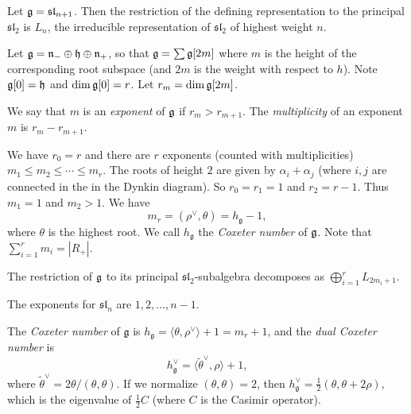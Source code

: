 \begin{example}
  Let $\mathfrak{g} = \mathfrak{sl}_{n + 1}$.
  Then the restriction of the defining
  representation to the principal
  $\mathfrak{sl}_2$ is $L_n$, the
  irreducible representation
  of $\mathfrak{sl}_2$ of highest weight $n$.
\end{example}

\begin{remark}
  Let $\mathfrak{g} = \mathfrak{n}_- \oplus \mathfrak{h} \oplus \mathfrak{n}_+$, so
  that $\mathfrak{g} = \sum \mathfrak{g}[2m]$ where $m$ is the
  height of the corresponding root subspace (and
  $2m$ is the weight with respect to
  $h$).
  Note $\mathfrak{g}[0] = \mathfrak{h}$
  and $\dim \mathfrak{g}[0] = r$.
  Let $r_m = \dim \mathfrak{g}[2m]$.
\end{remark}

\begin{definition}
  We say that $m$ is an
  \emph{exponent} of $\mathfrak{g}$ if
  $r_m > r_{m + 1}$. The
  \emph{multiplicity} of an exponent
  $m$ is $r_m - r_{m + 1}$.
\end{definition}

\begin{remark}
  We have $r_0 = r$ and there are
  $r$ exponents (counted with
  multiplicities)
  $m_1 \le m_2 \le \cdots \le m_r$.
  The roots of height $2$
  are given by $\alpha_i + \alpha_j$
  (where $i, j$ are connected in the
  in the Dynkin diagram).
  So $r_0 = r_1 = 1$ and
  $r_2 = r - 1$. Thus $m_1 = 1$
  and $m_2 > 1$. We have
  \[
    m_r = (\rho^\vee, \theta)
    = h_\mathfrak{g} - 1,
  \]
  where $\theta$ is the highest
  root. We call $h_\mathfrak{g}$
  the \emph{Coxeter number} of
  $\mathfrak{g}$. Note that
  $\sum_{i = 1}^r m_i = |R_+|$.
\end{remark}

\begin{prop}
  The restriction of $\mathfrak{g}$ to its
  principal $\mathfrak{sl}_2$-subalgebra
  decomposes as $\bigoplus_{i = 1}^r L_{2m_i + 1}$.
\end{prop}

\begin{example}
  The exponents for
  $\mathfrak{sl}_n$ are
  $1, 2, \dots, n - 1$.
\end{example}

\begin{definition}
  The \emph{Coxeter number}
  of $\mathfrak{g}$
  is $h_\mathfrak{g} = \langle \theta, \rho^\vee \rangle + 1 = m_r + 1$,
  and the \emph{dual Coxeter number}
  is
  \[
    h_\mathfrak{g}^\vee
    = \langle \widetilde{\theta}^\vee, \rho \rangle + 1,
  \]
  where $\widetilde{\theta}^\vee = 2\theta / (\theta, \theta)$.
  If we normalize $(\theta, \theta) = 2$,
  then $h_\mathfrak{g}^\vee = \frac{1}{2}(\theta, \theta + 2\rho)$, which
  is the eigenvalue of $\frac{1}{2} C$
  (where $C$ is the Casimir operator).
\end{definition}

